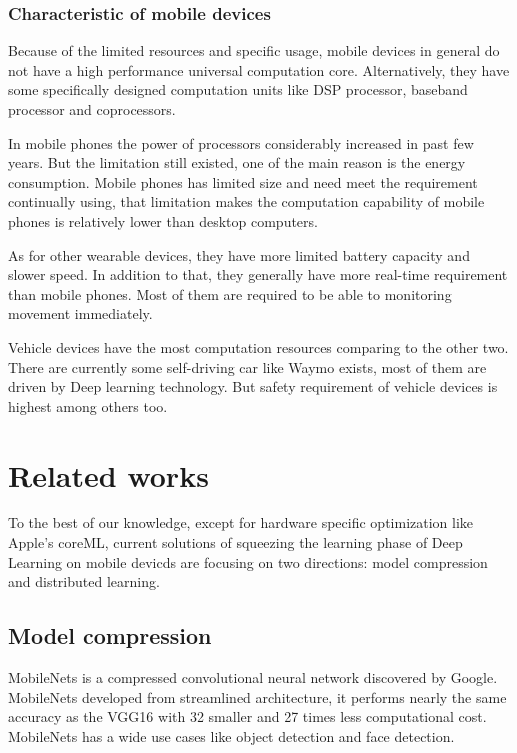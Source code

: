 \documentclass[article]{aaltoseries}
\begin{document}
\subsubsection{Characteristic of mobile devices}

Because of the limited resources and specific usage, mobile devices in general do not have a high performance 
universal computation core. Alternatively, they have some specifically designed computation units like DSP processor,
baseband processor and coprocessors.

In mobile phones the power of processors considerably increased in past few years. But the limitation still existed, 
one of the main reason is the energy consumption. Mobile phones has limited size and need meet the requirement continually
using, that limitation makes the computation capability of mobile phones is relatively lower than desktop computers.

As for other wearable devices, they have more limited battery capacity and slower speed. In addition to that, 
they generally have more real-time requirement than mobile phones. Most of them are required to be able to monitoring
movement immediately.

Vehicle devices have the most computation resources comparing to the other two. There are currently some self-driving
car like Waymo exists, most of them are driven by Deep learning technology. But safety requirement of vehicle devices
is highest among others too.  








\section{Related works}
\label{sec:related_works}

To the best of our knowledge, except for hardware specific optimization like Apple's coreML\cite{AppleInc.}, current solutions of squeezing the learning phase of Deep Learning on mobile devicds 
are focusing on two directions: model compression and distributed learning.

\subsection{Model compression}

MobileNets\cite{MobileNets2017} is a compressed convolutional neural network discovered by Google. MobileNets developed 
from streamlined architecture, it performs nearly the same accuracy as the VGG16\cite{simonyan2014very} with 32 smaller
and 27 times less computational cost. MobileNets has a wide use cases like object detection and face detection.
\end{document}
